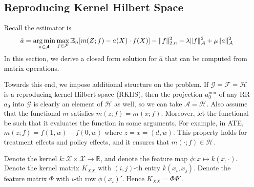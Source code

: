\subsection{Reproducing Kernel Hilbert Space}\label{sec:RKHS}


%

Recall the estimator is
$$
\hat{a} = \operatorname*{arg\,min}_{a\in {\mathcal A}} \max_{f\in {\mathcal F}} \mathbb{E}_n[m(Z; f) - a(X)\cdot f(X)] - \|f\|_{2,n}^2 - \lambda \|f\|_{{\mathcal A}}^2 + \mu \|a\|_{{\mathcal A}}^2
$$
In this section, we derive a closed form solution for $\hat{a}$ that can be computed from matrix operations.

Towards this end, we impose additional structure on the problem. If $\mathcal{G}=\mathcal{F}=\mathcal{H}$ is a reproducing kernel Hilbert space (RKHS), then the projection $a_0^{\min}$ of any RR $a_0$ into $\mathcal{G}$ is clearly an element of $\mathcal{H}$ as well, so we can take $\mathcal{A}=\mathcal{H}$. Also assume that the functional $m$ satisfies $m(z;f)=m(x;f)$. Moreover, let the functional be such that it evaluates the function in some arguments. For example, in ATE, $m(z;f)=f(1,w)-f(0,w)$ where $z=x=(d,w)$. This property holds for treatment effects and policy effects, and it ensures that $m(\cdot;f)\in\mathcal{H}$.

Denote the kernel $k:\mathcal{X}\times\mathcal{X}\rightarrow\mathbb{R}$, and denote the feature map $\phi:x\mapsto k(x,\cdot)$. Denote the kernel matrix $K_{XX}$ with $(i,j)$-th entry $k(x_i,x_j)$. Denote the feature matrix $\Phi$ with $i$-th row $\phi(x_i)'$. Hence $K_{XX}=\Phi\Phi'$.

